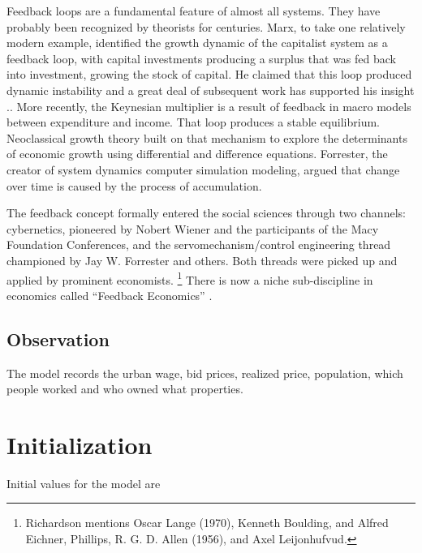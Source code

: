 Feedback loops are a fundamental feature of almost all systems. They have probably been recognized by theorists for centuries. Marx, to take one relatively modern example, identified the growth dynamic of the capitalist system  as a feedback loop, with capital investments producing a surplus that was fed back into investment, growing the stock of capital. He  claimed that this loop produced dynamic instability and a great deal of subsequent work has supported his insight \cite{dumenilStabilityInstabilityDynamic1986}.\cite{schumpeterInstabilityCapitalism1928}. More recently, the Keynesian multiplier is a result of feedback in macro models between expenditure and income. That loop produces a stable equilibrium. Neoclassical growth theory built on that mechanism to explore the determinants of economic growth using differential and difference equations. Forrester, the creator of system dynamics computer simulation modeling, argued that change over time is caused by the process of accumulation.

The feedback concept formally entered the social sciences through two channels: cybernetics, pioneered by Nobert Wiener  and the participants of the Macy Foundation Conferences, and the servomechanism/control engineering thread championed by Jay W. Forrester and others. Both threads were picked up and applied by prominent economists. \footnote{Richardson \cite{richardsonFeedbackThoughtSocial1991} mentions Oscar Lange (1970), Kenneth Boulding, and Alfred Eichner, Phillips,  R. G. D. Allen (1956), and Axel Leijonhufvud.} There is now a niche sub-discipline in economics called ``Feedback Economics'' \cite{radzickiIntroductionFeedbackEconomics, cavanaFeedbackEconomicsEconomic2021}. %



\subsection{Observation}
The model records the urban wage, bid prices, realized price, population, which people worked and who owned what properties.

\section{Initialization}
Initial values for the model are


